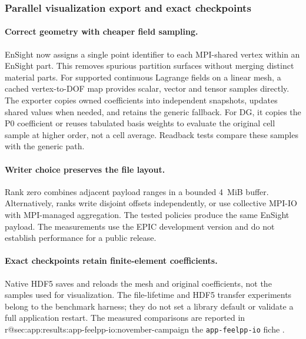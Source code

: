 \subsubsection{Parallel visualization export and exact checkpoints}
\label{sec:Feelpp:implementation-2026:io}

\paragraph{Correct geometry with cheaper field sampling.}
EnSight now assigns a single point identifier to each MPI-shared vertex
within an EnSight part. This removes spurious partition surfaces without
merging distinct material parts. For supported continuous Lagrange fields
on a linear mesh, a cached vertex-to-DOF map provides scalar, vector and
tensor samples directly. The exporter copies owned coefficients into
independent snapshots, updates shared values when needed, and retains the
generic fallback. For DG, it copies the P0 coefficient or reuses tabulated
basis weights to evaluate the original cell sample at higher order, not a
cell average. Readback tests compare these samples with the generic path.

\paragraph{Writer choice preserves the file layout.}
Rank zero combines adjacent payload ranges in a bounded 4~MiB buffer.
Alternatively, ranks write disjoint offsets independently, or use
collective MPI-IO with MPI-managed aggregation. The tested policies
produce the same EnSight payload. The measurements use the EPIC
development version and do not establish performance for a public release.

\paragraph{Exact checkpoints retain finite-element coefficients.}
Native HDF5 saves and reloads the mesh and original coefficients, not
the samples used for visualization. The file-lifetime and HDF5 transfer
experiments belong to the benchmark harness; they do not set a library
default or validate a full application restart.
The measured comparisons are reported in
\ifcsname r@sec:app:results:app-feelpp-io:november-campaign\endcsname
\else
  the \texttt{app-feelpp-io} fiche%
\fi.

